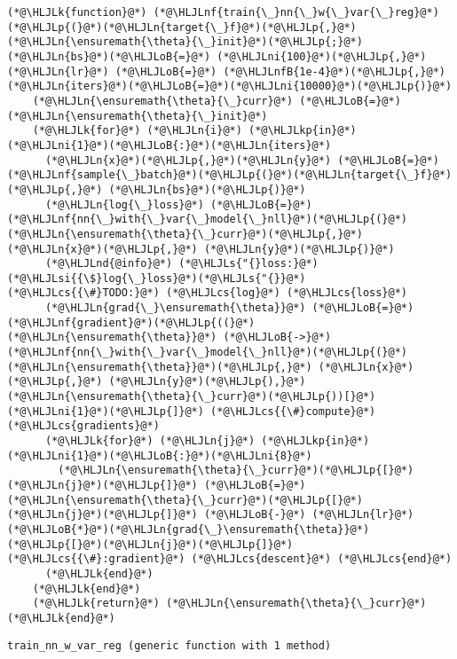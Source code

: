 \documentclass[12pt,a4paper]{article}
\newcommand{\HLJLk}[1]{\textcolor[RGB]{148,91,176}{\textbf{#1}}}
\newcommand{\HLJLkp}[1]{\textcolor[RGB]{148,91,176}{\textbf{#1}}}
\newcommand{\HLJLn}[1]{#1}
\newcommand{\HLJLnd}[1]{\textcolor[RGB]{214,102,97}{#1}}
\newcommand{\HLJLnf}[1]{\textcolor[RGB]{66,102,213}{#1}}
\newcommand{\HLJLs}[1]{\textcolor[RGB]{201,61,57}{#1}}
\newcommand{\HLJLsi}[1]{#1}
\newcommand{\HLJLnfB}[1]{\textcolor[RGB]{59,151,46}{#1}}
\newcommand{\HLJLni}[1]{\textcolor[RGB]{59,151,46}{#1}}
\newcommand{\HLJLoB}[1]{\textcolor[RGB]{102,102,102}{\textbf{#1}}}
\newcommand{\HLJLp}[1]{#1}
\newcommand{\HLJLcs}[1]{\textcolor[RGB]{153,153,119}{\textit{#1}}}
\begin{document}
\begin{lstlisting}
(*@\HLJLk{function}@*) (*@\HLJLnf{train{\_}nn{\_}w{\_}var{\_}reg}@*)(*@\HLJLp{(}@*)(*@\HLJLn{target{\_}f}@*)(*@\HLJLp{,}@*) (*@\HLJLn{\ensuremath{\theta}{\_}init}@*)(*@\HLJLp{;}@*) (*@\HLJLn{bs}@*)(*@\HLJLoB{=}@*) (*@\HLJLni{100}@*)(*@\HLJLp{,}@*) (*@\HLJLn{lr}@*) (*@\HLJLoB{=}@*) (*@\HLJLnfB{1e-4}@*)(*@\HLJLp{,}@*) (*@\HLJLn{iters}@*)(*@\HLJLoB{=}@*)(*@\HLJLni{10000}@*)(*@\HLJLp{)}@*)
    (*@\HLJLn{\ensuremath{\theta}{\_}curr}@*) (*@\HLJLoB{=}@*) (*@\HLJLn{\ensuremath{\theta}{\_}init}@*)
    (*@\HLJLk{for}@*) (*@\HLJLn{i}@*) (*@\HLJLkp{in}@*) (*@\HLJLni{1}@*)(*@\HLJLoB{:}@*)(*@\HLJLn{iters}@*)
      (*@\HLJLn{x}@*)(*@\HLJLp{,}@*)(*@\HLJLn{y}@*) (*@\HLJLoB{=}@*) (*@\HLJLnf{sample{\_}batch}@*)(*@\HLJLp{(}@*)(*@\HLJLn{target{\_}f}@*)(*@\HLJLp{,}@*) (*@\HLJLn{bs}@*)(*@\HLJLp{)}@*)
      (*@\HLJLn{log{\_}loss}@*) (*@\HLJLoB{=}@*) (*@\HLJLnf{nn{\_}with{\_}var{\_}model{\_}nll}@*)(*@\HLJLp{(}@*)(*@\HLJLn{\ensuremath{\theta}{\_}curr}@*)(*@\HLJLp{,}@*) (*@\HLJLn{x}@*)(*@\HLJLp{,}@*) (*@\HLJLn{y}@*)(*@\HLJLp{)}@*)
      (*@\HLJLnd{@info}@*) (*@\HLJLs{"{}loss:}@*) (*@\HLJLsi{{\$}log{\_}loss}@*)(*@\HLJLs{"{}}@*) (*@\HLJLcs{{\#}TODO:}@*) (*@\HLJLcs{log}@*) (*@\HLJLcs{loss}@*)
      (*@\HLJLn{grad{\_}\ensuremath{\theta}}@*) (*@\HLJLoB{=}@*) (*@\HLJLnf{gradient}@*)(*@\HLJLp{((}@*)(*@\HLJLn{\ensuremath{\theta}}@*) (*@\HLJLoB{->}@*) (*@\HLJLnf{nn{\_}with{\_}var{\_}model{\_}nll}@*)(*@\HLJLp{(}@*)(*@\HLJLn{\ensuremath{\theta}}@*)(*@\HLJLp{,}@*) (*@\HLJLn{x}@*)(*@\HLJLp{,}@*) (*@\HLJLn{y}@*)(*@\HLJLp{),}@*) (*@\HLJLn{\ensuremath{\theta}{\_}curr}@*)(*@\HLJLp{))[}@*)(*@\HLJLni{1}@*)(*@\HLJLp{]}@*) (*@\HLJLcs{{\#}compute}@*) (*@\HLJLcs{gradients}@*)
      (*@\HLJLk{for}@*) (*@\HLJLn{j}@*) (*@\HLJLkp{in}@*) (*@\HLJLni{1}@*)(*@\HLJLoB{:}@*)(*@\HLJLni{8}@*)
        (*@\HLJLn{\ensuremath{\theta}{\_}curr}@*)(*@\HLJLp{[}@*)(*@\HLJLn{j}@*)(*@\HLJLp{]}@*) (*@\HLJLoB{=}@*) (*@\HLJLn{\ensuremath{\theta}{\_}curr}@*)(*@\HLJLp{[}@*)(*@\HLJLn{j}@*)(*@\HLJLp{]}@*) (*@\HLJLoB{-}@*) (*@\HLJLn{lr}@*)(*@\HLJLoB{*}@*)(*@\HLJLn{grad{\_}\ensuremath{\theta}}@*)(*@\HLJLp{[}@*)(*@\HLJLn{j}@*)(*@\HLJLp{]}@*)(*@\HLJLcs{{\#}:gradient}@*) (*@\HLJLcs{descent}@*) (*@\HLJLcs{end}@*)
      (*@\HLJLk{end}@*)
    (*@\HLJLk{end}@*)
    (*@\HLJLk{return}@*) (*@\HLJLn{\ensuremath{\theta}{\_}curr}@*)
(*@\HLJLk{end}@*)
\end{lstlisting}

\begin{lstlisting}
train_nn_w_var_reg (generic function with 1 method)
\end{lstlisting}
\end{document}
